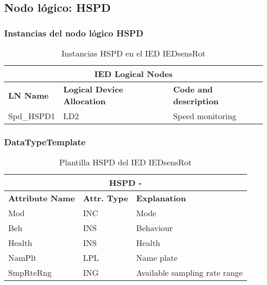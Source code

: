 
\subsection{Nodo l\'ogico: 			 HSPD}

    \subsubsection{Instancias del nodo l\'ogico HSPD}
    \begin{table}[H]
    \begin{center}
    \begin{tabular}{|l|l|p{6.8cm}|}
            \hline
            \multicolumn{3}{|c|}{\cellcolor[gray]{0.8} \textbf{IED Logical Nodes} } \\
            \hline
            \textbf{LN Name} & \textbf{Logical Device Allocation} & \textbf{Code and description} \\
            \hline
            Spd\_HSPD1 & LD2 & Speed monitoring \\
            \hline
    \end{tabular}
    \caption{Instancias HSPD en el IED IEDsensRot}
    \label{table:lnInstHSPD_1}
    \end{center}
    \end{table}
    
    
    
    \subsubsection{DataTypeTemplate}
    \begin{table}[H]
    \begin{center}
    \begin{tabular}{|l|l|p{8.5cm}|}
            \hline
            \multicolumn{3}{|c|}{\cellcolor[gray]{0.8} \textbf{ HSPD}  -  } \\
            \hline
            \textbf{Attribute Name} & \textbf{Attr. Type} & \textbf{Explanation} \\
            \hline 
            Mod & INC & Mode \\
            \hline
            Beh & INS & Behaviour \\
            \hline
            Health & INS & Health \\
            \hline
            NamPlt & LPL & Name plate \\
            \hline
            SmpRteRng & ING & Available sampling rate range \\
            \hline
    \end{tabular}
    \caption{Plantilla HSPD del IED IEDsensRot}
    \label{table:lnTypeHSPD_1}
    \end{center}
    \end{table}
    
    
    